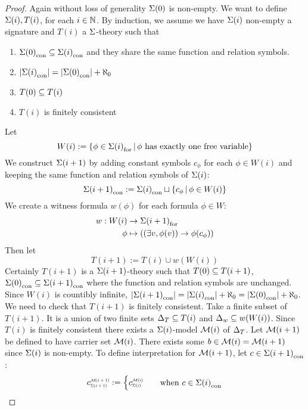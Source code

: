 \begin{proof}
    Again without loss of generality $\Sigma(0)$ is non-empty.
    We want to define $\Sigma(i),T(i)$, 
    for each $i \in \mathbb{N}$.    
    By induction, 
    we assume we have $\Sigma(i)$ non-empty a signature and 
    $T(i)$ a $\Sigma$-theory such that 
    \begin{enumerate}
        \item ${\Sigma(0)}_\mathrm{con} \subseteq {\Sigma(i)}_\mathrm{con}$
        and they share the same function and relation symbols.
        \item $|{\Sigma(i)}_\mathrm{con}| = |{\Sigma(0)}_\mathrm{con}| + \aleph_0$
        \item $T(0) \subseteq T(i)$
        \item $T(i)$ is finitely consistent
    \end{enumerate}
    Let 
    \[
        W(i) := \left\{\phi \in {\Sigma(i)}_\mathrm{for} 
        \,|\, \phi \text{ has exactly one free variable}\right\}
    \]
    We construct $\Sigma(i+1)$ 
    by adding constant symbols $c_\phi$ for each $\phi \in W(i)$ and 
    keeping the same function and relation symbols of $\Sigma(i)$:
    \[
        {\Sigma(i+1)}_\mathrm{con} :=
        {\Sigma(i)}_\mathrm{con} \sqcup \left\{c_\phi
        \,|\, \phi \in W(i)\right\}
    \]
    We create a witness formula $w(\phi)$ for each formula $\phi \in W$:
    \begin{align*}
        w : W(i) &\to {\Sigma(i+1)}_\mathrm{for}\\
        \phi &\mapsto ((\exists v, \phi(v)) \to \phi(c_\phi))
    \end{align*}
    Then let \[T(i+1) := T(i) \cup w(W(i))\]
    Certainly
    $T(i+1)$ is a $\Sigma(i+1)$-theory such that $T(0) \subseteq T(i+1)$,
    ${\Sigma(0)}_\mathrm{con} \subseteq {\Sigma(i+1)}_\mathrm{con}$ 
    where the function and relation symbols are unchanged.
    Since $W(i)$ is countibly infinite, 
    $|{\Sigma(i+1)}_\mathrm{con}| = |{\Sigma(i)}_\mathrm{con}| + \aleph_0 = 
    |{\Sigma(0)}_\mathrm{con}| + \aleph_0 $.
    We need to check that $T(i+1)$ is finitely consistent.
    Take a finite subset of $T(i+1)$.
    It is a union of two finite sets 
    $\Delta_T \subseteq T(i)$ and $\Delta_w \subseteq w(W(i))$.
    Since $T(i)$ is finitely consistent there exists a $\Sigma(i)$-model
    $\mathcal{M}(i)$ of $\Delta_T$.
    Let $\mathcal{M}(i+1)$ be defined to have carrier set ${\mathcal{M}(i)}$.
    There exists some $b \in \mathcal{M}(i) = \mathcal{M}(i+1)$ since $\Sigma(i)$ is non-empty.
    To define interpretation for $\mathcal{M}(i+1)$, 
    let $c \in {\Sigma(i+1)}_\mathrm{con}$:
    \[
        \subintp{\Si(i+1)}{\MM(i+1)}{c} := 
        \begin{cases}
            \subintp{\Si(i)}{\MM(i)}{c} \quad &\text{when }  
            c \in \const{\Si(i)} \\

\end{cases}\]
\end{proof}
